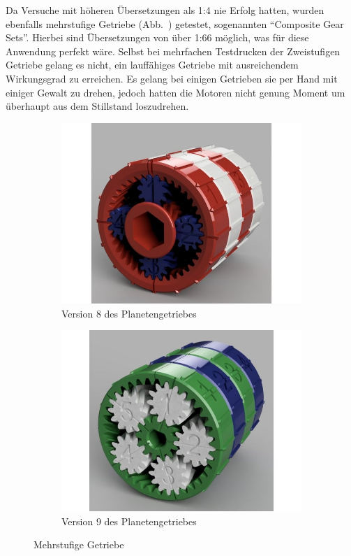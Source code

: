 Da Versuche mit höheren Übersetzungen als 1:4 nie Erfolg hatten, wurden ebenfalls mehrstufige Getriebe (Abb.~\label{bild:compgetr}) getestet, sogenannten ``Composite Gear Sets''.
Hierbei sind Übersetzungen von über 1:66 möglich, was für diese Anwendung perfekt wäre. 
Selbst bei mehrfachen Testdrucken der Zweistufigen Getriebe gelang es nicht, ein lauffähiges Getriebe mit ausreichendem Wirkungsgrad zu erreichen.
Es gelang bei einigen Getrieben sie per Hand mit einiger Gewalt zu drehen, jedoch hatten die Motoren nicht genung Moment um überhaupt aus dem Stillstand loszudrehen.

\begin{figure}[H]
	\centering
	\begin{subfigure}[b]{0.4\textwidth}
		\includegraphics[width=\textwidth]{bilder/GetriebeVersion5-1.jpg}
		\caption{Version 8 des Planetengetriebes \cite{link:planetgear5-1}}
		\label{bild:gearversion5-1}
	\end{subfigure}
	\hspace{0.1\textwidth}%
	\begin{subfigure}[b]{0.4\textwidth}
		\includegraphics[width=\textwidth]{bilder/GetriebeVersion5-2.jpg}
		\caption{Version 9 des Planetengetriebes \cite{link:planetgear5-2}}
		\label{bild:gearversion5-2}
	\end{subfigure}
	\caption{Mehrstufige Getriebe}
	\label{bild:compgetr}
\end{figure}

